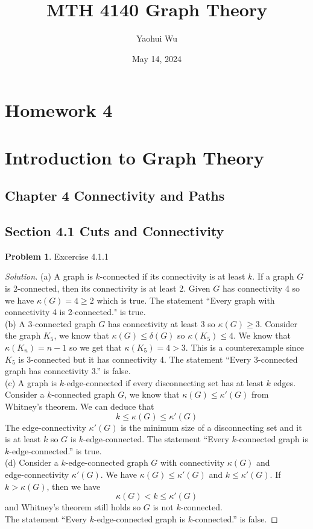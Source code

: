 \documentclass[12pt]{article}
\title{MTH 4140 Graph Theory}
\author{Yaohui Wu}
\date{May 14, 2024}
\theoremstyle{definition}
\newtheorem{problem}{Problem}
\newenvironment*{solution}{\begin{proof}[Solution]}{\end{proof}}
\begin{document}
\maketitle
\section*{Homework 4}
\section*{Introduction to Graph Theory}

\subsection*{Chapter 4 Connectivity and Paths}
\subsection*{Section 4.1 Cuts and Connectivity}
\begin{problem}
    Excercise 4.1.1
\end{problem}
\begin{solution}
    (a) A graph is \(k\)-connected if its connectivity is at least \(k\).
    If a graph \(G\) is 2-connected, then its connectivity is at least 2.
    Given \(G\) has connectivity 4 so we have \(\kappa(G)=4\geq2\) which is
    true.
    The statement ``Every graph with connectivity 4 is 2-connected." is
    true. \\
    (b) A 3-connected graph \(G\) has connectivity at least 3 so
    \(\kappa(G)\geq3\).
    Consider the graph \(K_5\), we know that \(\kappa(G)\leq\delta(G)\) so
    \(\kappa(K_5)\leq4\).
    We know that \(\kappa(K_n)=n-1\) so we get that \(\kappa(K_5)=4>3\).
    This is a counterexample since \(K_5\) is 3-connected but it has
    connectivity 4.
    The statement ``Every 3-connected graph has connectivity 3.'' is false. \\
    (c) A graph is \(k\)-edge-connected if every disconnecting set has at
    least \(k\) edges.
    Consider a \(k\)-connected graph \(G\), we know that
    \(\kappa(G)\leq\kappa'(G)\) from Whitney's theorem.
    We can deduce that \[k \leq \kappa(G) \leq \kappa'(G) \]
    The edge-connectivity \(\kappa'(G)\) is the minimum size of a
    disconnecting set and it is at least \(k\) so \(G\) is
    \(k\)-edge-connected.
    The statement ``Every \(k\)-connected graph is \(k\)-edge-connected.'' is
    true. \\
    (d) Consider a \(k\)-edge-connected graph \(G\) with connectivity
    \(\kappa(G)\) and \\ edge-connectivity \(\kappa'(G)\).
    We have \(\kappa(G)\leq\kappa'(G)\) and \(k\leq\kappa'(G)\).
    If \(k>\kappa(G)\), then we have \[\kappa(G)<k\leq\kappa'(G)\] and
    Whitney's theorem still holds so \(G\) is not \(k\)-connected. \\
    The statement ``Every \(k\)-edge-connected graph is \(k\)-connected.'' is
    false.
\end{solution}
\end{document}
